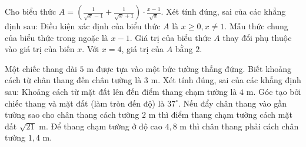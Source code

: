 \begin{ex}%
	Cho biểu thức $A = \left( \frac{1}{\sqrt{x} - 1} + \frac{1}{\sqrt{x} + 1} \right) \cdot \frac{x - 1}{\sqrt{x}}$. Xét tính đúng, sai của các khẳng định sau:
	\choiceTF
	{Điều kiện xác định của biểu thức $A$ là $x \ge 0, x \ne 1$.}
	{\True Mẫu thức chung của biểu thức trong ngoặc là $x - 1$.}
	{Giá trị của biểu thức $A$ thay đổi phụ thuộc vào giá trị của biến $x$.}
	{\True Với $x = 4$, giá trị của $A$ bằng $2$.}
\end{ex}

\begin{ex}%
	Một chiếc thang dài $5\text{ m}$ được tựa vào một bức tường thẳng đứng. Biết khoảng cách từ chân thang đến chân tường là $3\text{ m}$. Xét tính đúng, sai của các khẳng định sau:
	\choiceTF
	{\True Khoảng cách từ mặt đất lên đến điểm thang chạm tường là $4\text{ m}$.}
	{Góc tạo bởi chiếc thang và mặt đất (làm tròn đến độ) là $37^\circ$.}
	{\True Nếu đẩy chân thang vào gần tường sao cho chân thang cách tường $2\text{ m}$ thì điểm thang chạm tường cách mặt đất $\sqrt{21}\text{ m}$.}
	{\True Để thang chạm tường ở độ cao $4{,}8\text{ m}$ thì chân thang phải cách chân tường $1{,}4\text{ m}$.}
\end{ex}

